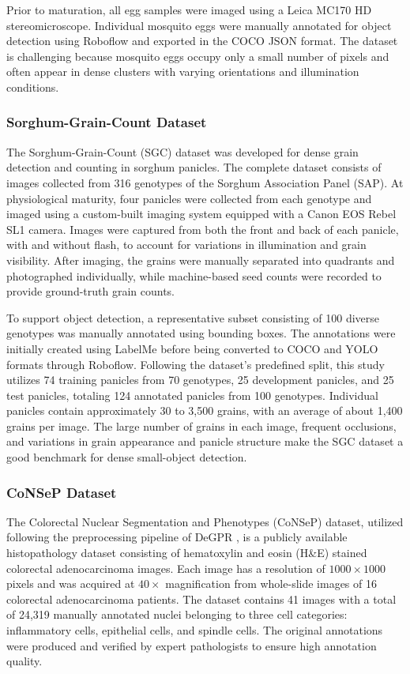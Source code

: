 Prior to maturation, all egg samples were imaged using a Leica MC170 HD stereomicroscope. Individual mosquito eggs were manually annotated for object detection using Roboflow and exported in the COCO JSON format. The dataset is challenging because mosquito eggs occupy only a small number of pixels and often appear in dense clusters with varying orientations and illumination conditions.

\subsubsection{Sorghum-Grain-Count Dataset}

The Sorghum-Grain-Count (SGC) dataset \cite{Bakshi2025} was developed for dense grain detection and counting in sorghum panicles. The complete dataset consists of images collected from 316 genotypes of the Sorghum Association Panel (SAP). At physiological maturity, four panicles were collected from each genotype and imaged using a custom-built imaging system equipped with a Canon EOS Rebel SL1 camera. Images were captured from both the front and back of each panicle, with and without flash, to account for variations in illumination and grain visibility. After imaging, the grains were manually separated into quadrants and photographed individually, while machine-based seed counts were recorded to provide ground-truth grain counts.

To support object detection, a representative subset consisting of 100 diverse genotypes was manually annotated using bounding boxes. The annotations were initially created using LabelMe before being converted to COCO and YOLO formats through Roboflow. Following the dataset's predefined split, this study utilizes 74 training panicles from 70 genotypes, 25 development panicles, and 25 test panicles, totaling 124 annotated panicles from 100 genotypes. Individual panicles contain approximately 30 to 3,500 grains, with an average of about 1,400 grains per image. The large number of grains in each image, frequent occlusions, and variations in grain appearance and panicle structure make the SGC dataset a good benchmark for dense small-object detection.

\subsubsection{CoNSeP Dataset}

The Colorectal Nuclear Segmentation and Phenotypes (CoNSeP) dataset, utilized following the preprocessing pipeline of DeGPR \cite{Tyagi2023}, is a publicly available histopathology dataset consisting of hematoxylin and eosin (H\&E) stained colorectal adenocarcinoma images. Each image has a resolution of $1000\times1000$ pixels and was acquired at $40\times$ magnification from whole-slide images of 16 colorectal adenocarcinoma patients. The dataset contains 41 images with a total of 24,319 manually annotated nuclei belonging to three cell categories: inflammatory cells, epithelial cells, and spindle cells. The original annotations were produced and verified by expert pathologists to ensure high annotation quality.

